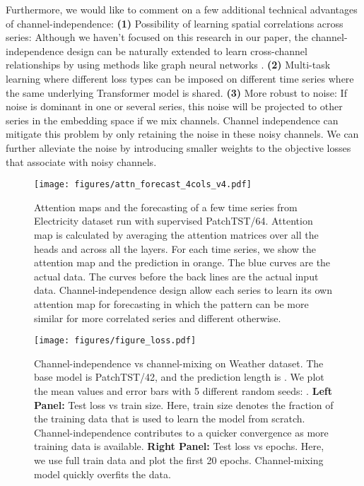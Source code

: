 \documentclass{article} \usepackage{iclr2023_conference,times}
\begin{document}
Furthermore, we would like to comment on a few additional technical advantages of channel-independence: \textbf{(1)} Possibility of learning spatial correlations across series: Although we haven't focused on this research in our paper, the channel-independence design can be naturally extended to learn cross-channel relationships by using methods like graph neural networks \citep{graph1,graph2}. \textbf{(2)} Multi-task learning where different loss types can be imposed on different time series where the same underlying Transformer model is shared. \textbf{(3)} More robust to noise: If noise is dominant in one or several series, this noise will be projected to other series in the embedding space if we mix channels. Channel independence can mitigate this problem by only retaining the noise in these noisy channels. We can further alleviate the noise by introducing smaller weights to the objective losses that associate with noisy channels.

\begin{figure}[h]
\hspace*{-0.5cm}
\texttt{[image: figures/attn\_forecast\_4cols\_v4.pdf]}
\caption{Attention maps and the forecasting of a few time series from Electricity dataset run with supervised PatchTST/64. Attention map is calculated by averaging the attention matrices over all the heads and across all the layers. For each time series, we show the attention map and the prediction in orange. The blue curves are the actual data. The curves before the back lines are the actual input data. Channel-independence design allow each series to learn its own attention map for forecasting in which the pattern can be more similar for more correlated series and different otherwise.}
\label{fig::attnmap}
\end{figure}

\begin{figure}[htbp!]
\begin{center}
\texttt{[image: figures/figure\_loss.pdf]}
\end{center}
\caption{Channel-independence vs channel-mixing on Weather dataset. The base model is PatchTST/42, and the prediction length is . We plot the mean values and error bars with 5 different random seeds: . \textbf{Left Panel:} Test loss vs train size. Here, train size denotes the fraction of the training data that is used to learn the model from scratch. Channel-independence contributes to a quicker convergence as more training data is available. \textbf{Right Panel:} Test loss vs epochs. Here, we use full train data and plot the first 20 epochs. Channel-mixing model quickly overfits the data.}
\label{fig::weather}
\end{figure}
\end{document}
